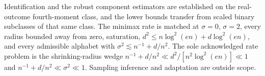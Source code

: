Identification and the robust component estimators are established on the real-outcome fourth-moment class, and the lower bounds transfer from scaled binary subclasses of that same class.  The minimax rate is matched at \(\sigma=0\), \(\sigma=2\), every radius bounded away from zero, saturation, \(d^2\le n\log^2(en)+d\log^2(en)\), and every admissible alphabet with \(\sigma^2\lesssim n^{-1}+d/n^2\).  The sole acknowledged rate problem is the shrinking-radius wedge \(n^{-1}+d/n^2\ll d^2/[n^2\log^2(en)]\ll1\) and \(n^{-1}+d/n^2\ll\sigma^2\ll1\).  Sampling inference and adaptation are outside scope.